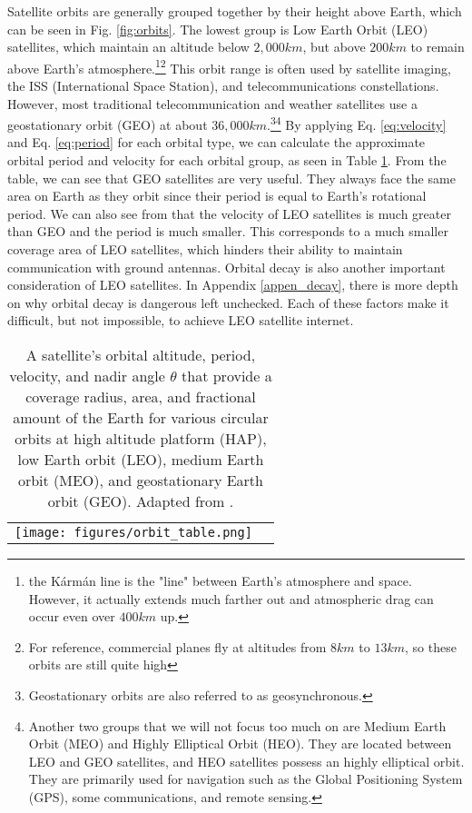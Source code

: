\documentclass[10pt]{article}
\begin{document}
Satellite orbits are generally grouped together by their height above Earth, which can be seen in Fig. \ref{fig:orbits}\cite{Types_of_orbits}. The lowest group is Low Earth Orbit (LEO) satellites, which maintain an altitude below $2,000\si{km}$, but above $200\si{km}$ to remain above Earth's atmosphere.\footnote{the Kármán line is the "line" between Earth's atmosphere and space. However, it actually extends much farther out and atmospheric drag can occur even over $400\si{km}$ up.}\footnote{For reference, commercial planes fly at altitudes from $8\si{km}$ to $13\si{km}$, so these orbits are still quite high} This orbit range is often used by satellite imaging, the ISS (International Space Station), and telecommunications constellations. However, most traditional telecommunication and weather satellites use a geostationary orbit (GEO) at about $36,000\si{km}$\cite{a_lost_connection}.\footnote{Geostationary orbits are also referred to as geosynchronous.}\footnote{Another two groups that we will not focus too much on are Medium Earth Orbit (MEO) and Highly Elliptical Orbit (HEO). They are located between LEO and GEO satellites, and HEO satellites possess an highly elliptical orbit. They are primarily used for navigation such as the Global Positioning System (GPS), some communications, and remote sensing.} By applying Eq. \ref{eq:velocity} and Eq. \ref{eq:period} for each orbital type, we can calculate the approximate orbital period and velocity for each orbital group, as seen in Table \ref{tab:orbits}. From the table, we can see that GEO satellites are very useful. They always face the same area on Earth as they orbit since their period is equal to Earth's rotational period. We can also see from that the velocity of LEO satellites is much greater than GEO and the period is much smaller. This corresponds to a much smaller coverage area of LEO satellites, which hinders their ability to maintain communication with ground antennas. Orbital decay is also another important consideration of LEO satellites. In Appendix \ref{appen_decay}, there is more depth on why orbital decay is dangerous left unchecked. Each of these factors make it difficult, but not impossible, to achieve LEO satellite internet.

\begin{table}[ht]
\caption{A satellite's orbital altitude, period, velocity, and nadir angle $\theta$ that provide a coverage radius, area, and fractional amount of the Earth for various circular orbits at high altitude platform (HAP), low Earth orbit (LEO), medium Earth orbit (MEO), and geostationary Earth orbit (GEO). Adapted from \cite{richharia_westbrook_2010}.}
\centering
\begin{tabular}{cc}
\texttt{[image: figures/orbit\_table.png]}
\end{tabular}
\label{tab:orbits}
\end{table}
\end{document}
